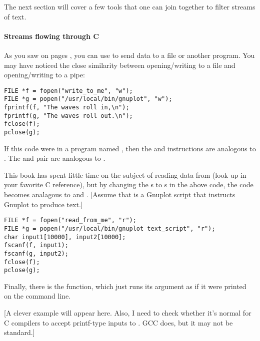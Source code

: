 The next section will cover a few tools that one can join together to
filter streams of text.

\paragraph{Streams flowing through C}

As you saw on pages \pageref{fprintf}{\it ff}, you can use 
to send data to a file or another program. You may have noticed the
close similarity between opening/writing to a file and opening/writing
to a pipe:  
\begin{lstlisting}
FILE *f = fopen("write_to_me", "w");
FILE *g = popen("/usr/local/bin/gnuplot", "w");
fprintf(f, "The waves roll in,\n");
fprintf(g, "The waves roll out.\n");
fclose(f);
pclose(g);
\end{lstlisting}
If this code were in a program named , then the 
and  instructions are analogous to 
. The  and  pair are
analogous to .

This book has spent little time on the subject of reading data from
 (look up  in your favorite C reference), but by
changing the s to s in the above code, the code becomes
analagous to
 and .
[Assume that  is a Gnuplot script that instructs
Gnuplot to produce text.]
\begin{lstlisting}
FILE *f = fopen("read_from_me", "r");
FILE *g = popen("/usr/local/bin/gnuplot text_script", "r");
char input1[10000], input2[10000];
fscanf(f, input1);
fscanf(g, input2);
fclose(f);
pclose(g);
\end{lstlisting}


Finally, there is the  function, which just runs its
argument as if it were printed on the command line.

[A clever example will appear here. Also, I need to check whether it's
normal for C compilers to accept printf-type inputs to . GCC
does, but it may not be standard.]

